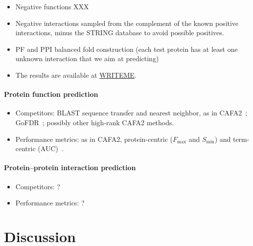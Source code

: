 \documentclass{bioinfo}
\begin{document}
\begin{itemize}

    \item Negative functions XXX

    \item Negative interactions sampled from the complement of the known
    positive interactions, minus the STRING database to avoid possible
    positives.

    \item PF and PPI balanced fold construction (each test protein has
    at least one unknown interaction that we aim at predicting)

    \item The results are available at \url{WRITEME}.

\end{itemize}

\paragraph{Protein function prediction}

\begin{itemize}

    \item Competitors: BLAST sequence transfer and nearest neighbor, as in
    CAFA2~\cite{jiang2016cafa2}; GoFDR~\cite{gong2016gofdr}; possibly other high-rank CAFA2 methods.

    \item Performance metrics: as in CAFA2, protein-centric ($F_\text{max}$ and $S_\text{min}$)
    and term-centric (AUC)~\cite{jiang2016cafa2}.

\end{itemize}

\paragraph{Protein--protein interaction prediction}

\begin{itemize}

    \item Competitors: ?

    \item Performance metrics: ?

\end{itemize}



\section{Discussion}
\end{document}
